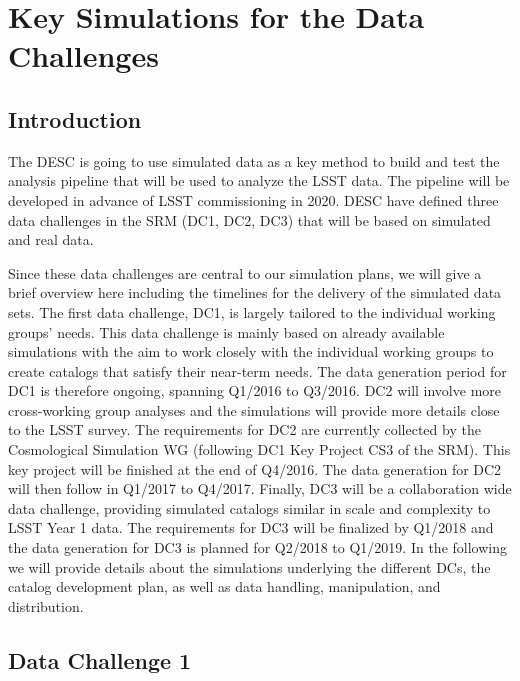 \section{Key Simulations for the Data Challenges}
\resetnumbering
\label{sec:keysims}



\subsection{Introduction}
\label{sec:keysims:introduction}

The DESC is going  to use simulated data as a key method to build and test the analysis pipeline that will be used to analyze the LSST data. The pipeline will be developed in advance of LSST commissioning in 2020. DESC have defined three data challenges in the SRM (DC1, DC2, DC3) that will be based on simulated and real data. 

Since these data challenges are central to our simulation plans, we will give a brief overview here including the timelines for the delivery of the simulated data sets. The first data challenge, DC1, is largely tailored to the individual working groups' needs. This data challenge is mainly based on already available simulations with the aim to work closely with the individual working groups to create catalogs that satisfy their near-term needs. The data generation period for DC1 is therefore ongoing, spanning Q1/2016 to Q3/2016. DC2 will involve more cross-working group analyses and the simulations will provide more details close to the LSST survey. The requirements for DC2 are currently collected by the Cosmological Simulation WG (following DC1 Key Project CS3 of the SRM). This key project will be finished at the end of Q4/2016. The data generation for DC2 will then follow in Q1/2017 to Q4/2017. Finally, DC3 will be a collaboration wide data challenge, providing simulated catalogs similar in scale and complexity to LSST Year 1 data. The requirements for DC3 will be finalized by Q1/2018 and the data generation for DC3 is planned for Q2/2018 to Q1/2019. In the following we will provide details about the simulations underlying the different DCs, the catalog development plan, as well as data handling, manipulation, and distribution.

\subsection{Data Challenge 1}
\label{sec:keysims:dc1}

